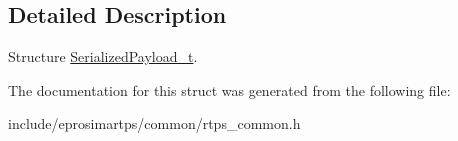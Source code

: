 \subsection{\-Detailed \-Description}
\-Structure \hyperlink{structeprosima_1_1rtps_1_1_serialized_payload__t}{\-Serialized\-Payload\-\_\-t}. 

\-The documentation for this struct was generated from the following file\-:\begin{DoxyCompactItemize}
\item 
include/eprosimartps/common/rtps\-\_\-common.\-h\end{DoxyCompactItemize}
